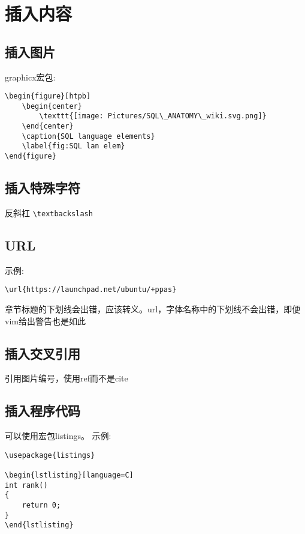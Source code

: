 
\section{插入内容}

\subsection{插入图片}
graphicx宏包:
\begin{verbatim}
\begin{figure}[htpb]
    \begin{center}
        \texttt{[image: Pictures/SQL\_ANATOMY\_wiki.svg.png]}
    \end{center}
    \caption{SQL language elements}
    \label{fig:SQL lan elem}
\end{figure}
\end{verbatim}


\subsection{插入特殊字符}
反斜杠 \verb+\textbackslash+

\subsection{URL}
示例:
\begin{verbatim}
\url{https://launchpad.net/ubuntu/+ppas}
\end{verbatim}
章节标题的下划线会出错，应该转义。url，字体名称中的下划线不会出错，即便vim给出警告也是如此

\subsection{插入交叉引用}
引用图片编号，使用ref而不是cite

\subsection{插入程序代码}
可以使用宏包listings。
示例:
\begin{verbatim}
\usepackage{listings} 

\begin{lstlisting}[language=C]
int rank()
{ 
    return 0;
}
\end{lstlisting}
\end{verbatim}


